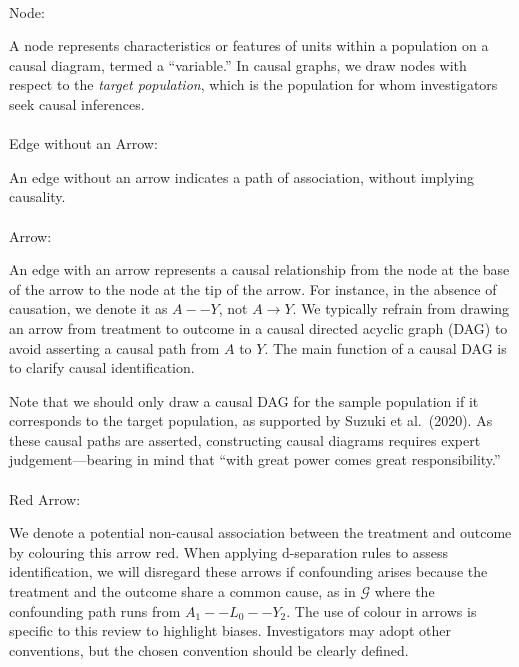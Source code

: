 \documentclass[
  single column]{article}
\makeatletter
\let\oldparagraph\paragraph
\renewcommand{\paragraph}{
    \@ifstar
      \xxxParagraphStar
      \xxxParagraphNoStar
  }
\newcommand{\xxxParagraphStar}[1]{\oldparagraph*{#1}\mbox{}}
\newcommand{\xxxParagraphNoStar}[1]{\oldparagraph{#1}\mbox{}}
\makeatother
\begin{document}
\paragraph{Node:}\label{node}

A node represents characteristics or features of units within a
population on a causal diagram, termed a ``variable.'' In causal graphs,
we draw nodes with respect to the \emph{target population}, which is the
population for whom investigators seek causal inferences.

\paragraph{Edge without an Arrow:}\label{edge-without-an-arrow}

An edge without an arrow indicates a path of association, without
implying causality.

\paragraph{Arrow:}\label{arrow}

An edge with an arrow represents a causal relationship from the node at
the base of the arrow to the node at the tip of the arrow. For instance,
in the absence of causation, we denote it as \(A -- Y\), not
\(A \rightarrow Y\). We typically refrain from drawing an arrow from
treatment to outcome in a causal directed acyclic graph (DAG) to avoid
asserting a causal path from \(A\) to \(Y\). The main function of a
causal DAG is to clarify causal identification.

Note that we should only draw a causal DAG for the sample population if
it corresponds to the target population, as supported by Suzuki et
al.~(2020). As these causal paths are asserted, constructing causal
diagrams requires expert judgement---bearing in mind that ``with great
power comes great responsibility.''

\paragraph{Red Arrow:}\label{red-arrow}

We denote a potential non-causal association between the treatment and
outcome by colouring this arrow red. When applying d-separation rules to
assess identification, we will disregard these arrows if confounding
arises because the treatment and the outcome share a common cause, as in
\(\mathcal{G}\) where the confounding path runs from
\(A_1 -- L_0 -- Y_2\). The use of colour in arrows is specific to this
review to highlight biases. Investigators may adopt other conventions,
but the chosen convention should be clearly defined.
\end{document}
